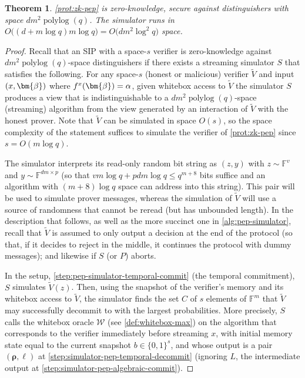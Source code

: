 \documentclass[10pt,a4paper]{article}
\newtheorem{theorem}{Theorem}[section]
\theoremstyle{definition}
\newcommand{\field}{\mathbb{F}}
\newcommand{\polylog}{\operatorname{polylog}}
\newcommand{\bitset}{\{0,1\}}
\newcommand{\vcommitlength}{v}
\newcommand{\vcommitstring}{z}
\newcommand{\pcommitlength}{p}
\newcommand{\pcommitstring}{y}
\newcommand{\dimension}{m}
\newcommand{\degree}{d}
\newcommand{\fieldsize}{q}
\newcommand{\evaluationpoint}{\bm{\fe2}}
\newcommand{\fingerprinttuple}{\bm{\rho}}
\renewcommand{\line}{L}
\newcommand{\snapshot}{b}
\newcommand{\whiteboxoracle}{\mathcal{W}}
\def\fe#1{
    \ifnum#1=1
        \alpha
    \else
    \ifnum#1=2
        \beta
    \else
    \ifnum#1=3
        \gamma
    \fi\fi\fi
}
\begin{document}
\begin{theorem}
    \label{thm:pep-zk}
    \cref{prot:zk-pep} is zero-knowledge, secure against distinguishers with space $\degree\dimension^2 \polylog(\fieldsize)$. The simulator runs in $O\big((\degree + \dimension \log \fieldsize) \dimension \log \fieldsize\big) = O\big(\degree \dimension^2 \log^2 \fieldsize\big)$ space.
\end{theorem}
\begin{proof}
    Recall that an SIP with a space-$s$ verifier is zero-knowledge against $\degree\dimension^2 \polylog(\fieldsize)$-space distinguishers if there exists a streaming simulator $S$ that satisfies the following. For any space-$s$ (honest or malicious) verifier $\widetilde V$ and input $(x, \evaluationpoint)$ where $f^x(\evaluationpoint) = \fe1$, given whitebox access to $\widetilde V$ the simulator $S$ produces a view that is indistinguishable to a $\degree\dimension^2 \polylog(\fieldsize)$-space (streaming) algorithm from the view generated by an interaction of $\widetilde V$ with the honest prover. Note that $\widetilde V$ can be simulated in space $O(s)$, so the space complexity of the statement suffices to simulate the verifier of \cref{prot:zk-pep} since  $s = O(\dimension \log \fieldsize)$.

    The simulator interprets its read-only random bit string as $(\vcommitstring, \pcommitstring)$ with $\vcommitstring \sim \field^\vcommitlength$ and $\pcommitstring \sim \field^{\degree \dimension \times \pcommitlength}$ (so that $\vcommitlength \dimension \log \fieldsize + \pcommitlength \degree \dimension \log \fieldsize \leq \fieldsize^{\dimension + 8}$ bits suffice and an algorithm with $(\dimension + 8) \log \fieldsize$ space can address into this string). This pair will be used to simulate prover messages, whereas the simulation of $\widetilde V$ will use a source of randomness that cannot be reread (but has unbounded length). In the description that follows, as well as the more succinct one in \cref{alg:pep-simulator}, recall that $\widetilde V$ is assumed to only output a decision at the end of the protocol (so that, if it decides to reject in the middle, it continues the protocol with dummy messages); and likewise if $S$ (or $P$) aborts.

    In the setup, \cref{step:pep-simulator-temporal-commit} (the temporal commitment), $S$ simulates $\widetilde V(\vcommitstring)$. Then, using the snapshot of the verifier's memory and its whitebox access to $\widetilde V$, the simulator finds the set $C$ of $s$ elements of $\field^\dimension$ that $\widetilde V$ may successfully decommit to with the largest probabilities. More precisely, $S$ calls the whitebox oracle $\whiteboxoracle$ (see \cref{def:whitebox-max}) on the algorithm that corresponds to the verifier immediately before streaming $x$, with initial memory state equal to the current snapshot $\snapshot \in \bitset^s$, and whose output is a pair $(\fingerprinttuple, \ell)$ at \cref{step:simulator-pep-temporal-decommit} (ignoring $\line$, the intermediate output at \cref{step:simulator-pep-algebraic-commit}).
    

\end{proof}
\end{document}
